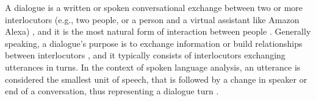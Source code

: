 




A dialogue is a written or spoken conversational exchange between two or more interlocutors (e.g., two people, or a person and a virtual assistant like Amazon Alexa) \citep{MerriamWebster2021Dialogue_Entry}, and it is the most natural form of interaction between people \citep{burtsev-etal-2018-deeppavlov}.
Generally speaking, a dialogue's purpose is to exchange information or build relationships between interlocutors \citep{bohm2013dialogue}, and it typically consists of interlocutors exchanging utterances in turns. In the context of spoken language analysis, an utterance is considered the smallest unit of speech, that is followed by a change in speaker or end of a conversation, thus representing a dialogue turn \citep{traum1996utterance}.

